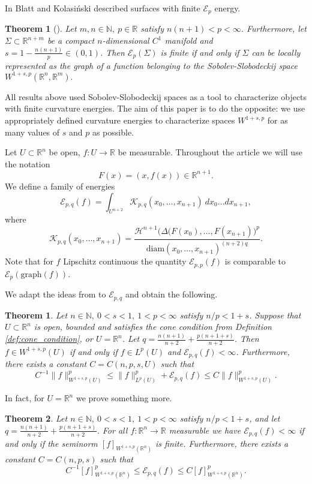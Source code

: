 \documentclass[11pt]{amsart}
\newcommand{\R}{\mathbb{R}}
\renewcommand{\H}{\mathscr{H}}
\newcommand{\diam}{\mathrm{diam}}
\newcommand{\Ep}{\mathcal{E}_p}
\newcommand{\Epq}{\mathcal{E}_{p,q}}
\newcommand{\K}{\mathcal{K}}
\newtheorem{theorem}{Theorem}[section]
\newtheorem*{theorem*}{Theorem}
\theoremstyle{definition}
\begin{document}
	In \cite{blatt2012sharp} Blatt and Kolasiński described surfaces with finite $\Ep$ energy.
	\begin{theorem*}[{\cite[Theorem 1.1]{blatt2012sharp}}]
		Let $m,n\in\mathbb{N},\ p\in\R$ satisfy $n(n+1)<p<\infty$. Furthermore, let $\Sigma\subset\R^{n+m}$ be a compact $n$-dimensional $C^1$ manifold and $s=1-\frac{n(n+1)}{p}\in (0,1)$. Then $\Ep(\Sigma)$ is finite if and only if $\Sigma$ can be locally represented as the graph of a function belonging to the Sobolev-Slobodeckij space $W^{1+s,p}(\R^n, \R^{m}).$
	\end{theorem*}
	
	
	All results above used Sobolev-Slobodeckij spaces as a tool to characterize objects with finite curvature energies. The aim of this paper is to do the opposite: we use appropriately defined curvature energies to characterize spaces $W^{1+s,p}$ for as many values of $s$ and $p$ as possible.
	
	Let $U\subset\R^n$ be open, $f:U\rightarrow\R$ be measurable. Throughout the article we will use the notation 
	\begin{equation*}
	F(x)=(x,f(x))\in\R^{n+1}.
	\end{equation*}
	We define a family of energies
	\[
	\mathcal{E}_{p,q}(f) = \int_{U^{n+2}} \K_{p,q}(x_0,\dots,x_{n+1})\ dx_0 \dots dx_{n+1},
	\]
	where
	\[
	\K_{p,q}(x_0,\dots,x_{n+1})=\frac{\H^{n+1}\big(\Delta(F(x_0),\dots,F(x_{n+1})\big)^p}{\diam(x_0,\dots,x_{n+1})^{(n+2)q}}.
	\]
	Note that for $f$ Lipschitz continuous the quantity $\mathcal{E}_{p,p}(f)$ is comparable to $\Ep(\text{graph} (f))$. 
	
	We adapt the ideas from \cite{blatt2012sharp} to $\mathcal{E}_{p,q}$ and obtain the following.
	\begin{theorem}\label{thm:mythm}
		Let $n\in\mathbb{N},\ 0<s<1,\ 1<p<\infty$ satisfy $n/p<1+s$. Suppose that $U \subset\R^n$ is open, bounded and satisfies the cone condition from Definition \ref{def:cone_condition}, or $U=\R^n$. Let $q= \frac{n(n+1)}{n+2} + \frac{p(n+1+s)}{n+2}$. Then $f\in W^{1+s,p}(U)$ if and only if $f\in L^p(U)$ and $\mathcal{E}_{p,q}(f)<\infty$. Furthermore, there exists a constant $C=C(n,p,s, U)$ such that
		\begin{equation*}
		C^{-1}\lVert f\rVert^p_{W^{1+s,p}(U)}\le \lVert f\rVert_{L^p( U)}^p + \Epq(f)\le C\lVert f\rVert^p_{W^{1+s,p}(U)}.
		\end{equation*}
	\end{theorem}
	In fact, for $U=\R^n$ we prove something more.
	\begin{theorem}\label{thm:mythm in Rn}
		Let $n\in\mathbb{N},\ 0<s<1,\ 1<p<\infty$ satisfy $n/p<1+s$, and let $q= \frac{n(n+1)}{n+2} + \frac{p(n+1+s)}{n+2}$.  For all $f:\R^n\rightarrow\R$ measurable we have $\Epq(f)<\infty$ if and only if the seminorm $[f]_{W^{1+s,p}(\R^n)}$ is finite. Furthermore, there exists a constant $C=C(n,p,s)$ such that
		\begin{equation*}
		C^{-1}[f]^p_{W^{1+s,p}(\R^n)}\le \Epq(f)\le C[f]^p_{W^{1+s,p}(\R^n)}.
		\end{equation*}
	\end{theorem}
	
\end{document}
